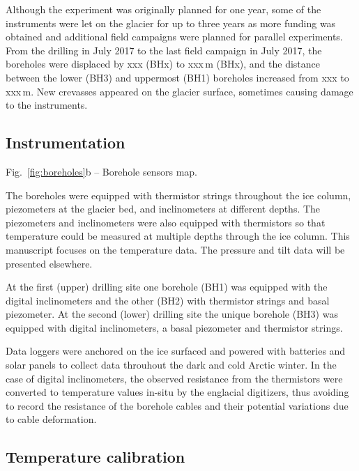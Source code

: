 \documentclass[utf8]{article}
\begin{document}
    Although the experiment was originally planned for one year, some of the
    instruments were let on the glacier for up to three years as more funding
    was obtained and additional field campaigns were planned for parallel
    experiments. From the drilling in July 2017 to the last field campaign in
    July 2017, the boreholes were displaced by xxx (BHx) to xxx\,m (BHx), and
    the distance between the lower (BH3) and uppermost (BH1) boreholes
    increased from xxx to xxx\,m. New crevasses appeared on the glacier
    surface, sometimes causing damage to the instruments.


\subsection{Instrumentation}

    Fig.~\ref{fig:boreholes}b -- Borehole sensors map.

    The boreholes were equipped with thermistor strings throughout the ice
    column, piezometers at the glacier bed, and inclinometers at different
    depths. The piezometers and inclinometers were also equipped with
    thermistors so that temperature could be measured at multiple depths
    through the ice column. This manuscript focuses on the temperature data.
    The pressure and tilt data will be presented elsewhere.

    At the first (upper) drilling site one borehole (BH1) was equipped with
    the digital inclinometers and the other (BH2) with thermistor strings
    and basal piezometer. At the second (lower) drilling site the unique
    borehole (BH3) was equipped with digital inclinometers, a basal
    piezometer and thermistor strings.

    Data loggers were anchored on the ice surfaced and powered with batteries
    and solar panels to collect data throuhout the dark and cold Arctic winter.
    In the case of digital inclinometers, the observed resistance from the
    thermistors were converted to temperature values in-situ by the englacial
    digitizers, thus avoiding to record the resistance of the borehole cables
    and their potential variations due to cable deformation.


\subsection{Temperature calibration}
\end{document}
